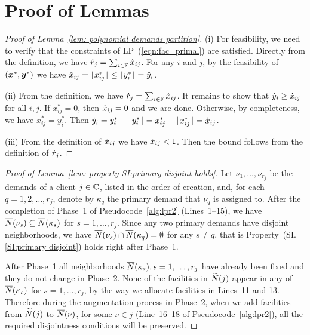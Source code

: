 \documentclass[11pt]{article}
\begin{document}
\section{Proof of Lemmas}
\begin{proof}[Proof of Lemma~\ref{lem: polynomial demands partition}]
(i) For feasibility, we need to verify that the constraints of LP~(\ref{eqn:fac_primal})
are satisfied. Directly from the definition, we have ${\hat r}_j = \sum_{i\in\mathbb{F}} {\hat x}_{ij}$.
For any $i$ and $j$, by the feasibility of $(\boldsymbol{x}^\ast,\boldsymbol{y}^\ast)$ we have
${\hat x}_{ij} = { \lfloor x_{ij}^\ast \rfloor } \le { \lfloor y^\ast_i \rfloor } = {\hat y}_i$.

(ii) From the definition, we have  ${\dot r}_j = \sum_{i\in\mathbb{F}} {\dot x}_{ij}$.
It remains to show that ${\dot y}_i \geq {\dot x}_{ij}$ for all $i,j$. 
If $x_{ij}^\ast=0$, then ${\dot x}_{ij}=0$ and we are done. 
Otherwise, by completeness, we have $x_{ij}^\ast=y_i^\ast$. 
Then  ${\dot y}_i = y_i^\ast - { \lfloor y_i^\ast \rfloor } = x_{ij}^\ast - { \lfloor x_{ij}^\ast \rfloor } ={\dot x}_{ij}$. 

(iii) From the definition of ${\dot x}_{ij}$ we have
  ${\dot x}_{ij} < 1$.  Then the bound follows from the definition of ${\dot r}_j$.
\end{proof}

\begin{proof}[Proof of Lemma~\ref{lem: property SI:primary disjoint
    holds}]
  Let $\nu_1,\ldots,\nu_{r_j}$ be the demands of a client
  $j\in\mathbb{C}$, listed in the order of creation, and, for each
  $q=1,2,\ldots,r_j$, denote by $\kappa_q$ the primary demand that
  $\nu_q$ is assigned to. After the completion of Phase~1 of
  Pseudocode~\ref{alg:lpr2} (Lines~1--15), we have
  ${\overline{N}}(\nu_s)\subseteq {\overline{N}}(\kappa_s)$ for  $s=1,\ldots,r_j$. 
Since any two primary demands have disjoint
  neighborhoods, we have ${\overline{N}}(\nu_s) \cap {\overline{N}}(\kappa_q) =
  \emptyset$ for any $s\neq q$, that is
	Property~(SI.\ref{SI:primary disjoint}) holds right after Phase~1.

        After Phase~1 all neighborhoods ${\overline{N}}(\kappa_s),
        s=1,\ldots,r_j$ have already been fixed and they do not change
        in Phase~2.  None of the facilities in ${\widetilde N}(j)$ appear in
        any of ${\overline{N}}(\kappa_s)$ for $s=1,\ldots,r_j$, by the way we
        allocate facilities in Lines~11 and 13.  Therefore during the
        augmentation process in Phase~2, when we add facilities from
        ${\widetilde N}(j)$ to ${\overline{N}}(\nu)$, for some $\nu\in j$
        (Line~16--18 of Pseudocode~\ref{alg:lpr2}), all the required
        disjointness conditions will be preserved.
\end{proof}
\end{document}
